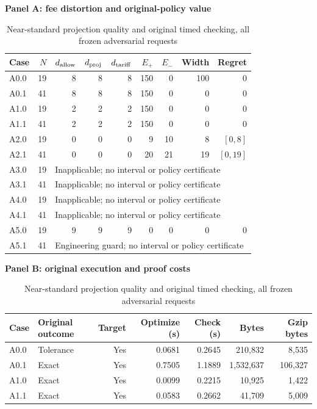 \documentclass[11pt,letterpaper]{article}
\theoremstyle{definition}\newtheorem{remark}[theorem]{Remark}
\begin{document}
\begin{table}[p]\centering
\caption{Near-standard projection quality and original timed checking, all frozen adversarial requests}\label{tab:projection64}
\begin{singlespace}\small
\textbf{Panel A: fee distortion and original-policy value}\par\smallskip
\begin{tabular}{lrrrrrrrr}\toprule
Case & $N$ & $d_{\rm allow}$ & $d_{\rm proj}$ & $d_{\rm tariff}$ & $E_+$ & $E_-$ & Width & Regret\\\midrule
A0.0 & 19 & 8 & 8 & 8 & 150 & 0 & 100 & 0 \\
A0.1 & 41 & 8 & 8 & 8 & 150 & 0 & 0 & 0 \\
A1.0 & 19 & 2 & 2 & 2 & 150 & 0 & 0 & 0 \\
A1.1 & 41 & 2 & 2 & 2 & 150 & 0 & 0 & 0 \\
A2.0 & 19 & 0 & 0 & 0 & 9 & 10 & 8 & $[0,8]$ \\
A2.1 & 41 & 0 & 0 & 0 & 20 & 21 & 19 & $[0,19]$ \\
A3.0 & 19 & \multicolumn{7}{l}{Inapplicable; no interval or policy certificate} \\
A3.1 & 41 & \multicolumn{7}{l}{Inapplicable; no interval or policy certificate} \\
A4.0 & 19 & \multicolumn{7}{l}{Inapplicable; no interval or policy certificate} \\
A4.1 & 41 & \multicolumn{7}{l}{Inapplicable; no interval or policy certificate} \\
A5.0 & 19 & 9 & 9 & 9 & 0 & 0 & 0 & 0 \\
A5.1 & 41 & \multicolumn{7}{l}{Engineering guard; no interval or policy certificate} \\
\bottomrule\end{tabular}\par\medskip
\textbf{Panel B: original execution and proof costs}\par\smallskip
\begin{tabular}{llrrrrr}\toprule
Case & Original outcome & Target & Optimize (s) & Check (s) & Bytes & Gzip bytes\\\midrule
A0.0 & Tolerance & Yes & 0.0681 & 0.2645 & 210,832 & 8,535 \\
A0.1 & Exact & Yes & 0.7505 & 1.1889 & 1,532,637 & 106,327 \\
A1.0 & Exact & Yes & 0.0099 & 0.2215 & 10,925 & 1,422 \\
A1.1 & Exact & Yes & 0.0583 & 0.2662 & 41,709 & 5,009 \\

\end{tabular}
\end{singlespace}
\end{table}
\end{document}
